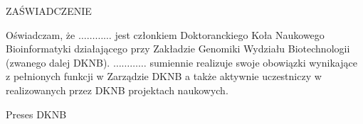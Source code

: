 \documentclass[12pt,firstpage,polish,a4paper]{letter}
\date{Wrocław, \today}
\begin{document}
 
\begin{letter}{}{}
 
\begin{center}\opening{ZAŚWIADCZENIE}
\end{center}

Oświadczam, że $\ldots \ldots \ldots \ldots$ jest członkiem Doktoranckiego Koła Naukowego Bioinformatyki działającego przy Zakładzie Genomiki Wydziału Biotechnologii (zwanego dalej DKNB). $\ldots \ldots \ldots \ldots$ sumiennie realizuje swoje obowiązki wynikające z pełnionych funkcji w Zarządzie DKNB a także aktywnie uczestniczy w realizowanych przez DKNB projektach naukowych.

\vfill

\begin{flushright}Preses DKNB
\end{flushright}
\end{letter}
\end{document}
